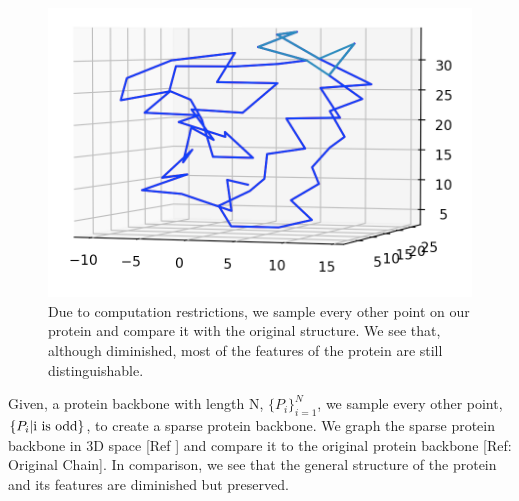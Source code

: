 \documentclass[12pt, a4paper, twocolumn, fullpage]{article}
\theoremstyle{plain}
\theoremstyle{definition}
\theoremstyle{remark}
\begin{document}
\begin{figure}[h]
    \centering
    \includegraphics[width=\linewidth]{1ux8sparse}
    \caption{Due to computation restrictions, we sample every other point on our protein and compare it with the original structure. We see that, although diminished, most of the features of the protein are still distinguishable.}
    \label{1ux8sparse}
\end{figure}

Given, a protein backbone with length N, $\{P_i\}^{N}_{i=1}$, we sample every other point, $\{P_i \space | \space \text{i is odd} \}$, to create a sparse protein backbone. We graph the sparse protein backbone in 3D space [Ref ] and compare it to the original protein backbone [Ref: Original Chain]. In comparison, we see that the general structure of the protein and its features are diminished but preserved.
\end{document}
